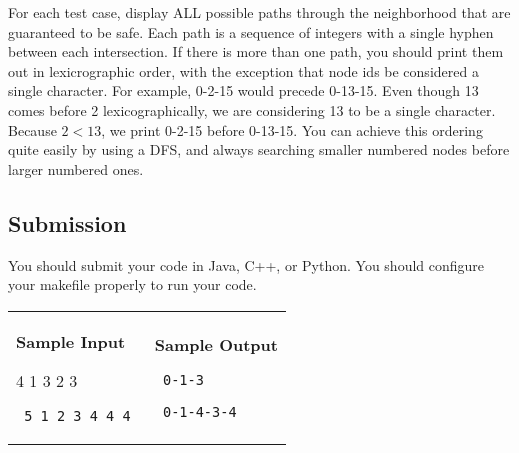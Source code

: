 \documentclass[11pt]{article}
\begin{document}
For each test case, display ALL possible paths through the neighborhood that are guaranteed to be safe. Each path is a sequence of integers with a single hyphen between each intersection. If there is more than one path, you should print them out in lexicrographic order, with the exception that node ids be considered a single character. For example, 0-2-15 would precede 0-13-15. Even though 13 comes before 2 lexicographically, we are considering 13 to be a single character. Because $2 < 13$, we print 0-2-15 before 0-13-15. You can achieve this ordering quite easily by using a DFS, and always searching smaller numbered nodes before larger numbered ones.

\subsection*{Submission}

You should submit your code in Java, C++, or Python. You should configure your makefile properly to run your code.


\vspace{0.25in}\hspace{-0.3in}\begin{tabular}{ll}

\parbox{3in}{{\large\bf Sample Input}

\vspace{0.15in}

{\tt 

4 1 3 2 3\linebreak

}

{\tt
5 1 2 3 4 4 4
}
}

&

\parbox{3in}{{\large\bf Sample Output}

\vspace{0.15in}

{\tt
0-1-3\linebreak
}

{\tt
0-1-4-3-4\linebreak
}
}

\\
\end{tabular}
\end{document}
